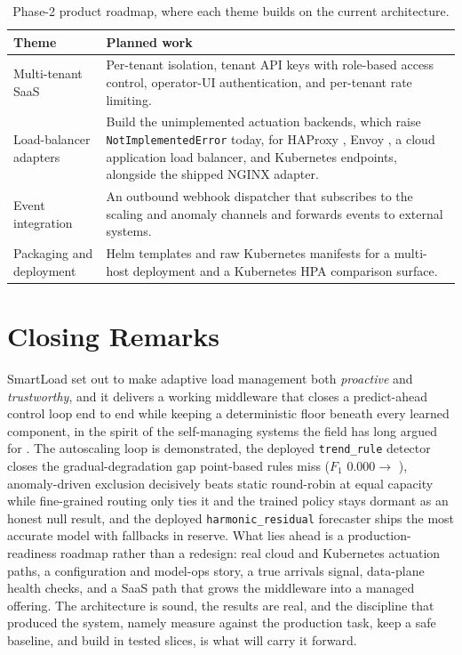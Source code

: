 \begin{table}[H]
  \centering
  \caption[Phase-2 product roadmap]{Phase-2 product roadmap, where each theme builds on the current architecture.}
  \label{tab:conc:roadmap}
  \small
  \begin{tabularx}{\linewidth}{@{}p{3.4cm} Y@{}}
    \toprule
    \headrow
    \textbf{Theme} & \textbf{Planned work} \\
    \midrule
    Multi-tenant SaaS
      & Per-tenant isolation, tenant API keys with role-based access control,
        operator-UI authentication, and per-tenant rate limiting. \\
    Load-balancer adapters
      & Build the unimplemented actuation backends, which raise
        \texttt{NotImplementedError} today, for HAProxy \cite{haproxy}, Envoy
        \cite{envoy}, a cloud application load balancer, and Kubernetes endpoints,
        alongside the shipped NGINX \cite{nginx} adapter. \\
    Event integration
      & An outbound webhook dispatcher that subscribes to the scaling and anomaly
        channels and forwards events to external systems. \\
    Packaging and deployment
      & Helm templates and raw Kubernetes manifests for a multi-host deployment and a
        Kubernetes HPA \cite{k8shpa} comparison surface. \\
    \bottomrule
  \end{tabularx}
\end{table}


\section{Closing Remarks}
\label{conc:closing}

SmartLoad set out to make adaptive load management both \emph{proactive} and
\emph{trustworthy}, and it delivers a working middleware that closes a predict-ahead
control loop end to end while keeping a deterministic floor beneath every learned
component, in the spirit of the self-managing systems the field has long argued for
\cite{kephart2003autonomic}. The autoscaling loop is demonstrated, the deployed
\texttt{trend\_rule} detector closes the gradual-degradation gap point-based rules miss
($F_1$ $0.000 \rightarrow{}$ \BManFone{}), anomaly-driven exclusion decisively beats static
round-robin at equal capacity while fine-grained routing only ties it and the trained
policy stays dormant as an honest null result, and the
deployed \texttt{harmonic\_residual} forecaster ships the most accurate model with
fallbacks in reserve. What lies ahead is a production-readiness roadmap rather than a
redesign: real cloud and Kubernetes actuation paths, a configuration and model-ops story,
a true arrivals signal, data-plane health checks, and a SaaS path that grows the
middleware into a managed offering. The architecture is sound, the results are real, and
the discipline that produced the system, namely measure against the production task, keep
a safe baseline, and build in tested slices, is what will carry it forward.
